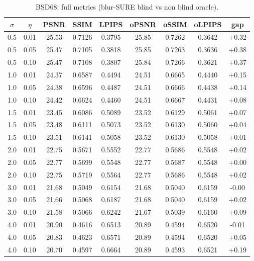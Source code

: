 \begin{table}[h]
\centering
\small
\begin{tabular}{ccccccccc}
\toprule
$\sigma$ & $\eta$ & PSNR & SSIM & LPIPS & oPSNR & oSSIM & oLPIPS & gap \\
\midrule
0.5 & 0.01 & 25.53 & 0.7126 & 0.3795 & 25.85 & 0.7262 & 0.3642 & +0.32 \\
0.5 & 0.05 & 25.47 & 0.7105 & 0.3818 & 25.85 & 0.7263 & 0.3636 & +0.38 \\
0.5 & 0.10 & 25.47 & 0.7108 & 0.3807 & 25.84 & 0.7266 & 0.3621 & +0.37 \\
1.0 & 0.01 & 24.37 & 0.6587 & 0.4494 & 24.51 & 0.6665 & 0.4440 & +0.15 \\
1.0 & 0.05 & 24.38 & 0.6596 & 0.4487 & 24.51 & 0.6666 & 0.4438 & +0.14 \\
1.0 & 0.10 & 24.42 & 0.6624 & 0.4460 & 24.51 & 0.6667 & 0.4431 & +0.08 \\
1.5 & 0.01 & 23.45 & 0.6086 & 0.5089 & 23.52 & 0.6129 & 0.5061 & +0.07 \\
1.5 & 0.05 & 23.48 & 0.6111 & 0.5073 & 23.52 & 0.6130 & 0.5060 & +0.04 \\
1.5 & 0.10 & 23.51 & 0.6141 & 0.5058 & 23.52 & 0.6130 & 0.5058 & +0.01 \\
2.0 & 0.01 & 22.75 & 0.5671 & 0.5552 & 22.77 & 0.5686 & 0.5548 & +0.02 \\
2.0 & 0.05 & 22.77 & 0.5699 & 0.5548 & 22.77 & 0.5687 & 0.5548 & +0.00 \\
2.0 & 0.10 & 22.75 & 0.5719 & 0.5564 & 22.77 & 0.5686 & 0.5548 & +0.02 \\
3.0 & 0.01 & 21.68 & 0.5049 & 0.6154 & 21.68 & 0.5040 & 0.6159 & -0.00 \\
3.0 & 0.05 & 21.66 & 0.5068 & 0.6187 & 21.68 & 0.5040 & 0.6159 & +0.02 \\
3.0 & 0.10 & 21.58 & 0.5066 & 0.6242 & 21.67 & 0.5039 & 0.6160 & +0.09 \\
4.0 & 0.01 & 20.90 & 0.4616 & 0.6513 & 20.89 & 0.4594 & 0.6520 & -0.01 \\
4.0 & 0.05 & 20.83 & 0.4623 & 0.6571 & 20.89 & 0.4594 & 0.6520 & +0.05 \\
4.0 & 0.10 & 20.70 & 0.4597 & 0.6664 & 20.89 & 0.4593 & 0.6521 & +0.19 \\
\bottomrule
\end{tabular}
\caption{BSD68: full metrics (blur-SURE blind vs non blind oracle).}
\label{tab:full_metrics_bsd68}
\end{table}
